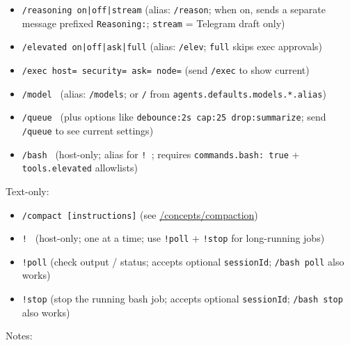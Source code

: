 \begin{itemize}
  \item \texttt{/reasoning on|off|stream} (alias: \texttt{/reason}; when on, sends a separate message prefixed \texttt{Reasoning:}; \texttt{stream} = Telegram draft only)
  \item \texttt{/elevated on|off|ask|full} (alias: \texttt{/elev}; \texttt{full} skips exec approvals)
  \item \texttt{/exec host= security= ask= node=} (send \texttt{/exec} to show current)
  \item \texttt{/model } (alias: \texttt{/models}; or \texttt{/} from \texttt{agents.defaults.models.*.alias})
  \item \texttt{/queue } (plus options like \texttt{debounce:2s cap:25 drop:summarize}; send \texttt{/queue} to see current settings)
  \item \texttt{/bash } (host-only; alias for \texttt{! }; requires \texttt{commands.bash: true} + \texttt{tools.elevated} allowlists)
\end{itemize}


Text-only:

\begin{itemize}
  \item \texttt{/compact [instructions]} (see \href{/concepts/compaction}{/concepts/compaction})
  \item \texttt{! } (host-only; one at a time; use \texttt{!poll} + \texttt{!stop} for long-running jobs)
  \item \texttt{!poll} (check output / status; accepts optional \texttt{sessionId}; \texttt{/bash poll} also works)
  \item \texttt{!stop} (stop the running bash job; accepts optional \texttt{sessionId}; \texttt{/bash stop} also works)
\end{itemize}


Notes:

